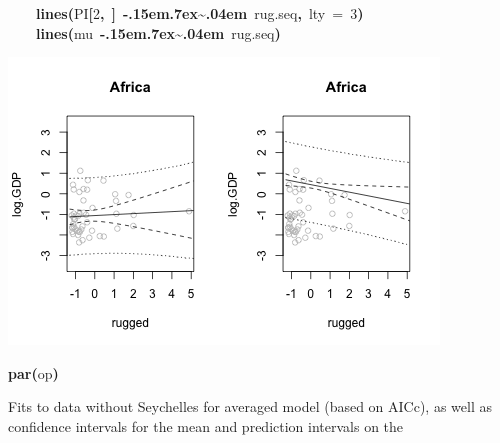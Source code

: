 \documentclass{article}
\makeatletter
\newcommand{\hlnumber}[1]{\textcolor[rgb]{0,0,0}{#1}}%
\newcommand{\hlfunctioncall}[1]{\textcolor[rgb]{.5,0,.33}{\textbf{#1}}}%
\newcommand{\hlkeyword}[1]{\textbf{#1}}%
\newcommand{\hlargument}[1]{\textcolor[rgb]{.69,.25,.02}{#1}}%
\newcommand{\hlsymbol}[1]{#1}%
\def\urltilda{\kern -.15em\lower .7ex\hbox{\~{}}\kern .04em}%
\newcommand{\hlstd}[1]{\textcolor[rgb]{0,0,0}{#1}}%
\newenvironment{kframe}{%
 \def\FrameCommand##1{\hskip\@totalleftmargin \hskip-\fboxsep
 \colorbox{shadecolor}{##1}\hskip-\fboxsep
     \hskip-\linewidth \hskip-\@totalleftmargin \hskip\columnwidth}%
 \MakeFramed {\advance\hsize-\width
   \@totalleftmargin\z@ \linewidth\hsize
   \@setminipage}}%
 {\par\unskip\endMakeFramed}
\newenvironment{knitrout}{}{} %
\makeatother
\begin{document}
\begin{knitrout}
{\begin{kframe}
\begin{flushleft}
\hlstd{}{\ }{\ }{\ }{\ }\hlfunctioncall{lines}\hlkeyword{(}\hlsymbol{PI}\hlkeyword{[}\hlnumber{2}\hlkeyword{,}{\ }\hlkeyword{]}{\ }\hlkeyword{\urltilda{}}{\ }\hlsymbol{rug.seq}\hlkeyword{,}{\ }\hlargument{lty}{\ }\hlargument{=}{\ }\hlnumber{3}\hlkeyword{)}\hspace*{\fill}\\
\hlstd{}{\ }{\ }{\ }{\ }\hlfunctioncall{lines}\hlkeyword{(}\hlsymbol{mu}{\ }\hlkeyword{\urltilda{}}{\ }\hlsymbol{rug.seq}\hlkeyword{)}\hspace*{\fill}\\
\hlstd{}\hlkeyword{\usebox{\hlnormalsizeboxclosebrace}}\mbox{}
\normalfont
\end{flushleft}
\includegraphics{AICc-avg} \begin{flushleft}
\ttfamily\noindent
\hlfunctioncall{par}\hlkeyword{(}\hlsymbol{op}\hlkeyword{)}\mbox{}
\normalfont
\end{flushleft}
\end{kframe}}
\end{knitrout}

Fits to data without Seychelles for averaged model (based on AICc), as well as confidence intervals for the mean and prediction intervals on the 
\end{document}
